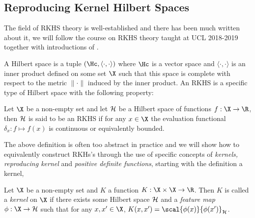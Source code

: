 \subsection{Reproducing Kernel Hilbert Spaces} The field of RKHS theory is
well-established and there has been much written about it, we will follow the
course on RKHS theory taught at UCL 2018-2019
\cite{gretton18_advan_topic_machin_learn} together with introductions of
\cite{manton15_primer_reprod_kernel_hilber_spaces,fasshauer11_posit_defin_kernel}.

A Hilbert space is a tuple \((\Hc, \langle \cdot, \cdot \rangle)\) where \(\Hc\)
is a vector space and \(\langle \cdot, \cdot \rangle\) is an inner product
defined on some set \(\X\) such that this space is complete with respect to the
metric \(\|\cdot\|\) induced by the inner product. An RKHS is a specific type of
Hilbert space with the following property:

\begin{definition}
\label{def:RKHS} Let \(\X\) be a non-empty set and let \(\mathcal{H}\) be a Hilbert
space of functions \(f: \X \to \R\), then \(\mathcal{H}\) is said to be an RKHS if
for any \(x \in \X\) the evaluation functional \(\delta_x: f \mapsto f(x)\) is
continuous or equivalently bounded.
\end{definition}

The above definition is often too abstract in practice and we will show how to
equivalently construct RKHs's through the use of specific concepts of
\emph{kernels, reproducing kernel} and \emph{positive definite functions},
starting with the definition a kernel,
\begin{definition}
\label{def:kernel} Let \(\X\) be a non-empty set and \(K\) a function \(K: \X
\times \X \to \R\). Then \(K\) is called a \textit{kernel} on \(\X\) if there
exists some Hilbert space \(\mathcal{H}\) and a \textit{feature map} \(\phi : \X
\to \rkhs{H}\) such that for any \(x, x' \in \X\), \(K(x, x') =
\scal{\phi(x)}{\phi(x')}_{\rkhs{H}}\).
\end{definition}


